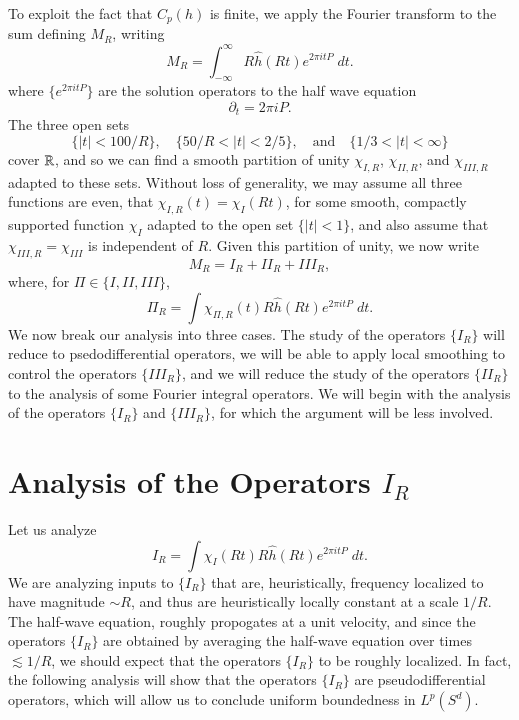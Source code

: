 To exploit the fact that $C_p(h)$ is finite, we apply the Fourier transform to the sum defining $M_R$, writing
%
\[ M_R = \int_{-\infty}^\infty R \widehat{h}(R t) e^{2 \pi i t P}\; dt. \]
%
where $\big\{ e^{2 \pi i t P} \big\}$ are the solution operators to the half wave equation
%
\[ \partial_t = 2 \pi i P. \]
%
The three open sets
%
\[ \{ |t| < 100/R \}, \quad \{ 50/R < |t| < 2/5 \}, \quad\text{and}\quad \{ 1/3 < |t| < \infty \} \]
%
cover $\operatorname{\mathbb{R}}$, and so we can find a smooth partition of unity $\chi_{I,R}$, $\chi_{II,R}$, and $\chi_{III,R}$ adapted to these sets. Without loss of generality, we may assume all three functions are even, that $\chi_{I,R}(t) = \chi_I(Rt)$, for some smooth, compactly supported function $\chi_I$ adapted to the open set $\{ |t| < 1 \}$, and also assume that $\chi_{III,R} = \chi_{III}$ is independent of $R$. Given this partition of unity, we now write
%
\[ M_R = I_R + II_R + III_R, \]
%
where, for $\Pi \in \{ I, II, III \}$,
%
\[ \Pi_R = \int \chi_{\Pi,R}(t) R \widehat{h}(Rt) e^{2 \pi i t P}\; dt. \]
%
We now break our analysis into three cases. The study of the operators $\{ I_R \}$ will reduce to psedodifferential operators, we will be able to apply local smoothing to control the operators $\{ III_R \}$, and we will reduce the study of the operators $\{ II_R \}$ to the analysis of some Fourier integral operators. We will begin with the analysis of the operators $\{ I_R \}$ and $\{ III_R \}$, for which the argument will be less involved.

\section{Analysis of the Operators $I_R$}

Let us analyze
%
\[ I_R = \int \chi_I(Rt) R \widehat{h}(Rt) e^{2 \pi i t P}\; dt. \]
%
We are analyzing inputs to $\{ I_R \}$ that are, heuristically, frequency localized to have magnitude $\sim R$, and thus are heuristically locally constant at a scale $1/R$. The half-wave equation, roughly propogates at a unit velocity, and since the operators $\{ I_R \}$ are obtained by averaging the half-wave equation over times $\lesssim 1/R$, we should expect that the operators $\{ I_R \}$ to be roughly localized. In fact, the following analysis will show that the operators $\{ I_R \}$ are pseudodifferential operators, which will allow us to conclude uniform boundedness in $L^p(S^d)$.

